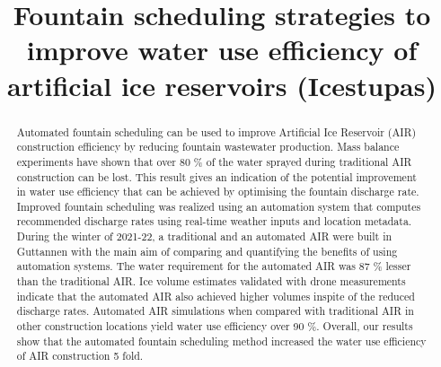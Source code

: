\documentclass[tc, manuscript]{copernicus}
\begin{document}
\title{Fountain scheduling strategies to improve water use efficiency of artificial
ice reservoirs (Icestupas)}

\def\Authors{Suryanarayanan Balasubramanian\,$^{1,2}$, Martin Hoelzle\,$^{1}$Roger Waser\,$^{3}$,Martin Von Burg\,$^{3}$,}
\def\Address{$^{1}$University of Fribourg, Department of Geosciences, Fribourg, Switzerland $^{2}$University of
Applied Sciences and Arts, Luzern, Switzerland} \def\corrAuthor{Suryanarayanan Balasubramanian}





\maketitle

\begin{abstract}

  Automated fountain scheduling can be used to improve Artificial Ice Reservoir (AIR) construction efficiency by
  reducing fountain wastewater production. Mass balance experiments have shown that over 80 \% of the water
  sprayed during traditional AIR construction can be lost. This result gives an indication of the potential
  improvement in water use efficiency that can be achieved by optimising the fountain discharge rate. Improved
  fountain scheduling was realized using an automation system that computes recommended discharge rates using
  real-time weather inputs and location metadata. During the winter of 2021-22, a traditional and an automated
  AIR were built in Guttannen with the main aim of comparing and quantifying the benefits of using automation
  systems. The water requirement for the automated AIR was 87 \% lesser than the traditional AIR. Ice volume
  estimates validated with drone measurements indicate that the automated AIR also achieved higher volumes
  inspite of the reduced discharge rates. Automated AIR simulations when compared with traditional AIR in other
  construction locations yield water use efficiency over 90 \%. Overall, our results show that the automated
  fountain scheduling method increased the water use efficiency of AIR construction 5 fold.

\end{abstract}
\end{document}

